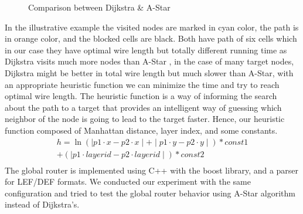 \documentclass[conference]{IEEEtran}
\begin{document}
\begin{figure} [hbt!]
{
}
\caption{Comparison between Dijkstra \& A-Star }
\label{fig:GlobalRoutingProcess}
\end{figure}
\medskip
In the illustrative example the visited nodes are marked in cyan color, the path is in orange color, and the blocked cells are black.
Both have path of six cells which in our case they have optimal wire length but totally different running time as Dijkstra visits much more nodes than A-Star
, in the case of many target nodes, Dijkstra might be better in total wire length but much slower than A-Star, with an appropriate heuristic function we can minimize the time and try to reach optimal wire length. The heuristic function is a way of informing the search about the path to a target that provides an intelligent way of guessing which neighbor of the node is going to lead to the target faster. Hence, our heuristic function composed of Manhattan distance, layer index, and some constants.
\begin{multline*}
    h = \ln (\mid p1 \cdot x-p2 \cdot x\mid+\mid p1 \cdot y-p2 \cdot y\mid)*const1 \\ 
     +(\mid p1 \cdot layerid-p2 \cdot layerid\mid)*const2 \\
\end{multline*}
The global router is implemented using C++ with the boost library, and a parser for LEF/DEF formats. We conducted our experiment with the same configuration and tried to test the global router behavior using A-Star algorithm instead of Dijkstra's.


\end{document}
